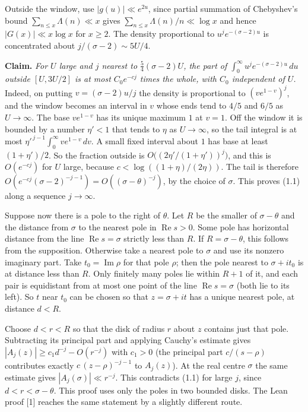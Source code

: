 \documentclass[11pt,letterpaper]{article}
\newcommand{\re}{\operatorname{Re}}
\begin{document}
{Outside the window, use $|g(u)|\ll e^{2u}$, since partial summation of Chebyshev's bound $\sum_{n\le x}\Lambda(n)\ll x$ gives $\sum_{n\le x}\Lambda(n)/n\ll\log x$ and hence $|G(x)|\ll x\log x$ for $x\ge2$. The density proportional to $u^je^{-(\sigma-2)u}$ is concentrated about $j/(\sigma-2)\sim5U/4$.

\textbf{Claim.} \textit{For $U$ large and $j$ nearest to $\tfrac54(\sigma-2)U$, the part of $\int_0^\infty u^je^{-(\sigma-2)u}\,du$ outside $[U,3U/2]$ is at most $C_0e^{-cj}$ times the whole, with $C_0$ independent of $U$.} Indeed, on putting $v=(\sigma-2)u/j$ the density is proportional to $(ve^{1-v})^j$, and the window becomes an interval in $v$ whose ends tend to $4/5$ and $6/5$ as $U\to\infty$. The base $ve^{1-v}$ has its unique maximum $1$ at $v=1$. Off the window it is bounded by a number $\eta'<1$ that tends to $\eta$ as $U\to\infty$, so the tail integral is at most $\eta'^{\,j-1}\int_0^\infty ve^{1-v}\,dv$. A small fixed interval about $1$ has base at least $(1+\eta')/2$. So the fraction outside is $O\big((2\eta'/(1+\eta'))^j\big)$, and this is $O(e^{-cj})$ for $U$ large, because $c<\log((1+\eta)/(2\eta))$. The tail is therefore $O(e^{-cj}(\sigma-2)^{-j-1})=O((\sigma-\theta)^{-j})$, by the choice of $\sigma$. This proves (1.1) along a sequence $j\to\infty$.

Suppose now there is a pole to the right of $\theta$. Let $R$ be the smaller of $\sigma-\theta$ and the distance from $\sigma$ to the nearest pole in $\re s>0$. Some pole has horizontal distance from the line $\re s=\sigma$ strictly less than $R$. If $R=\sigma-\theta$, this follows from the supposition. Otherwise take a nearest pole to $\sigma$ and use its nonzero imaginary part. Take $t_0=\operatorname{Im}\rho$ for that pole $\rho$; then the pole nearest to $\sigma+it_0$ is at distance less than $R$. Only finitely many poles lie within $R+1$ of it, and each pair is equidistant from at most one point of the line $\re s=\sigma$ (both lie to its left). So $t$ near $t_0$ can be chosen so that $z=\sigma+it$ has a unique nearest pole, at distance $d<R$.

Choose $d<r<R$ so that the disk of radius $r$ about $z$ contains just that pole. Subtracting its principal part and applying Cauchy's estimate gives $|A_j(z)|\ge c_1 d^{-j}-O(r^{-j})$ with $c_1>0$ (the principal part $c/(s-\rho)$ contributes exactly $c\,(z-\rho)^{-j-1}$ to $A_j(z)$). At the real centre $\sigma$ the same estimate gives $|A_j(\sigma)|\ll r^{-j}$. This contradicts (1.1) for large $j$, since $d<r<\sigma-\theta$. This proof uses only the poles in two bounded disks. The Lean proof [1] reaches the same statement by a slightly different route.

}
\end{document}
